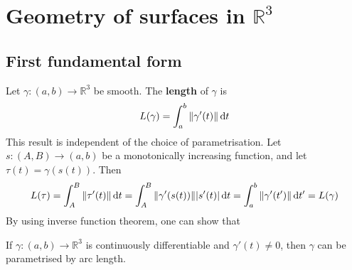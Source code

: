 \documentclass[a4paper]{article}
\begin{document}
\section{Geometry of surfaces in \( \mathbb R^3 \)}
\subsection{First fundamental form}

Let \( \gamma \colon (a,b) \to \mathbb R^3 \) be smooth.
The \textbf{length} of \( \gamma \) is
\[
	L(\gamma) = \int_a^b \norm{\gamma'(t)} \dd{t}
\]
This result is independent of the choice of parametrisation.
Let \( s \colon (A,B) \to (a,b) \) be a monotonically increasing function, and let \( \tau(t) = \gamma(s(t)) \).
Then
\[
	L(\tau) = \int_A^B \norm{\tau'(t)} \dd{t} = \int_A^B \norm{\gamma'(s(t))} \abs{s'(t)} \dd{t} = \int_a^b \norm{\gamma'(t')} \dd{t'} = L(\gamma)
\]
By using inverse function theorem, one can show that
\begin{lemma}
	If \( \gamma \colon (a,b) \to \mathbb R^3 \) is continuously differentiable and \( \gamma'(t) \neq 0 \), then \( \gamma \) can be parametrised by arc length.
\end{lemma} 
\end{document}
